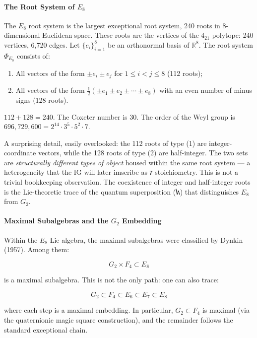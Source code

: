 \documentclass[12pt,a4paper]{article}
\begin{document}
\paragraph{The Root System of $E_8$}

The $E_8$ root system is the largest exceptional root system, 240 roots in 8-dimensional Euclidean space. These roots are the vertices of the $4_{21}$ polytope: 240 vertices, 6,720 edges. Let $\{e_i\}_{i=1}^8$ be an orthonormal basis of $\mathbb{R}^8$. The root system $\Phi_{E_8}$ consists of:

\begin{enumerate}
    \item All vectors of the form $\pm e_i \pm e_j$ for $1 \leq i < j \leq 8$ (112 roots);
    \item All vectors of the form $\frac{1}{2}(\pm e_1 \pm e_2 \pm \cdots \pm e_8)$ with an even number of minus signs (128 roots).
\end{enumerate}

$112 + 128 = 240$. The Coxeter number is 30. The order of the Weyl group is $696{,}729{,}600 = 2^{14} \cdot 3^5 \cdot 5^2 \cdot 7$.

A surprising detail, easily overlooked: the 112 roots of type (1) are integer-coordinate vectors, while the 128 roots of type (2) are half-integer. The two sets are \emph{structurally different types of object} housed within the same root system --- a heterogeneity that the IG will later imscribe as $𐑳$ stoichiometry. This is not a trivial bookkeeping observation. The coexistence of integer and half-integer roots is the Lie-theoretic trace of the quantum superposition ($𐑿$) that distinguishes $E_8$ from $G_2$.

\paragraph{Maximal Subalgebras and the $G_2$ Embedding}

Within the $E_8$ Lie algebra, the maximal subalgebras were classified by Dynkin (1957). Among them:

\[G_2 \times F_4 \subset E_8\]

is a maximal subalgebra. This is not the only path: one can also trace:

\[G_2 \subset F_4 \subset E_6 \subset E_7 \subset E_8\]

where each step is a maximal embedding. In particular, $G_2 \subset F_4$ is maximal (via the quaternionic magic square construction), and the remainder follows the standard exceptional chain.
\end{document}
